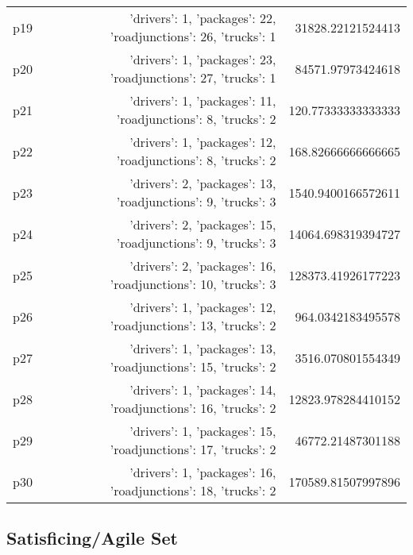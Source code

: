 \documentclass{article}
\begin{document}
\begin{center}
\begin{tabular}{r|r|r}
  p19&{'drivers': 1, 'packages': 22, 'roadjunctions': 26, 'trucks': 1}&31828.22121524413\\
  p20&{'drivers': 1, 'packages': 23, 'roadjunctions': 27, 'trucks': 1}&84571.97973424618\\
  p21&{'drivers': 1, 'packages': 11, 'roadjunctions': 8, 'trucks': 2}&120.77333333333333\\
  p22&{'drivers': 1, 'packages': 12, 'roadjunctions': 8, 'trucks': 2}&168.82666666666665\\
  p23&{'drivers': 2, 'packages': 13, 'roadjunctions': 9, 'trucks': 3}&1540.9400166572611\\
  p24&{'drivers': 2, 'packages': 15, 'roadjunctions': 9, 'trucks': 3}&14064.698319394727\\
  p25&{'drivers': 2, 'packages': 16, 'roadjunctions': 10, 'trucks': 3}&128373.41926177223\\
  p26&{'drivers': 1, 'packages': 12, 'roadjunctions': 13, 'trucks': 2}&964.0342183495578\\
  p27&{'drivers': 1, 'packages': 13, 'roadjunctions': 15, 'trucks': 2}&3516.070801554349\\
  p28&{'drivers': 1, 'packages': 14, 'roadjunctions': 16, 'trucks': 2}&12823.978284410152\\
  p29&{'drivers': 1, 'packages': 15, 'roadjunctions': 17, 'trucks': 2}&46772.21487301188\\
  p30&{'drivers': 1, 'packages': 16, 'roadjunctions': 18, 'trucks': 2}&170589.81507997896
                            \end{tabular}
                            \end{center}
                    

                                \subsection*{Satisficing/Agile Set}
                                
\end{document}
